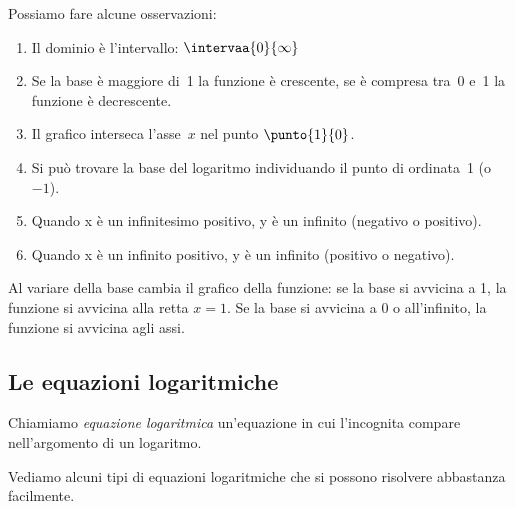 \begin{minipage}{.52\textwidth}
 Possiamo fare alcune osservazioni:
\begin{enumerate}
 \item Il dominio è l'intervallo: \(\intervaa{0}{\infty}\)
 \item Se la base è maggiore di~1 la funzione è crescente, 
 se è compresa tra~0 e~1 la funzione è decrescente.
 \item Il grafico interseca l'asse~\(x\) nel punto \(\punto{1}{0}\).
 \item Si può trovare la base del logaritmo individuando il punto di 
 ordinata~1 (o~\(-1\)).
 \item Quando x è un infinitesimo positivo, y è un infinito (negativo o 
positivo).
 \item Quando x è un infinito positivo, y è un infinito (positivo o 
negativo).
\end{enumerate}
\end{minipage} \qquad 
\begin{minipage}{.45\textwidth}
 \begin{inaccessibleblock}
  \logdiversebasi
\label{fig:diversebasi}
\end{inaccessibleblock}
\label{fig:log_diversebasi}
\end{minipage}

\vspace{.5cm}

Al variare della base cambia il grafico della funzione: 
se la base si avvicina a 1, la funzione si avvicina 
alla retta \(x=1\). 
Se la base si avvicina a 0 o all'infinito, la funzione si avvicina agli 
assi.

\subsection{Le equazioni logaritmiche}
\label{subsec:esplog_equazionilogaritmiche}

\begin{definizione}{
Chiamiamo \emph{equazione logaritmica} un'equazione in cui l'incognita 
compare 
nell'argomento di un logaritmo.
}
\end{definizione}

Vediamo alcuni tipi di equazioni logaritmiche che si possono risolvere 
abbastanza facilmente.

